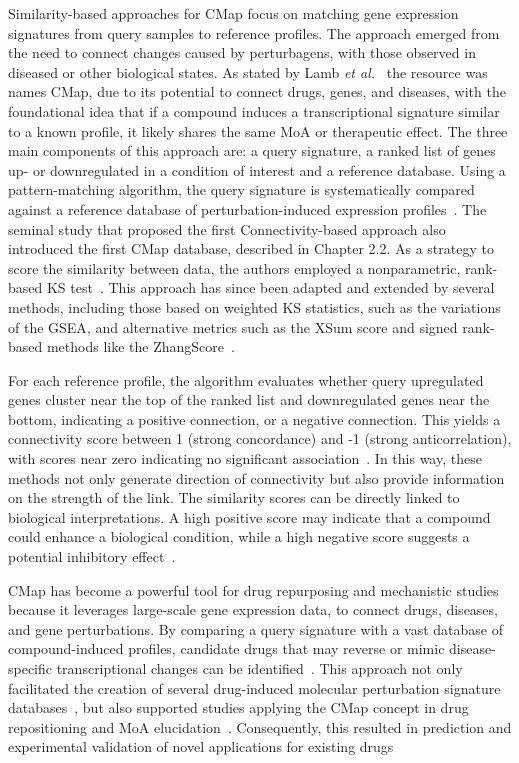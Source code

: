 Similarity-based approaches for \gls{CMap} focus on matching gene expression signatures from query samples to reference profiles. 
The approach emerged from the need to connect changes caused by perturbagens, with those observed in diseased or other biological states.
As stated by Lamb \textit{et al.}~\cite{RN34} the resource was names \gls{CMap}, due to its potential to connect drugs, genes, and diseases, with the foundational idea that if a compound induces a transcriptional signature similar to a known profile, it likely shares the same \gls{MoA} or therapeutic effect. 
The three main components of this approach are: a query signature, a ranked list of genes up- or downregulated in a condition of interest and a reference database.  
Using a pattern-matching algorithm, the query signature is systematically compared against a reference database of perturbation-induced expression profiles~\cite{RN155}. 
The seminal study that proposed the first Connectivity-based approach also introduced the first CMap database, described in Chapter 2.2. 
As a strategy to score the similarity between data, the authors employed a nonparametric, rank-based \gls{KS} test~\cite{RN34, RN79}. 
This approach has since been adapted and extended by several methods, including those based on weighted \gls{KS} statistics, such as the variations of the \gls{GSEA}, and alternative metrics such as the \gls{XSum} score and signed rank-based methods like the ZhangScore~\cite{RN79}. 

For each reference profile, the algorithm evaluates whether query upregulated genes cluster near the top of the ranked list and downregulated genes near the bottom, indicating a positive connection, or a negative connection. 
This yields a connectivity score between 1 (strong concordance) and -1 (strong anticorrelation), with scores near zero indicating no significant association~\cite{RN34}. 
In this way, these methods not only generate direction of connectivity but also provide information on the strength of the link. 
The similarity scores can be directly linked to biological interpretations. 
A high positive score may indicate that a compound could enhance a biological condition, while a high negative score suggests a potential inhibitory effect~\cite{RN102}. 

\gls{CMap} has become a powerful tool for drug repurposing and mechanistic studies because it leverages large-scale gene expression data, to connect drugs, diseases, and gene perturbations. 
By comparing a query signature with a vast database of compound-induced profiles, candidate drugs that may reverse or mimic disease-specific transcriptional changes can be identified~\cite{RN102}. 
This approach not only facilitated the creation of several drug-induced molecular perturbation signature databases~\cite{RN84},  but also supported studies applying the \gls{CMap} concept in drug repositioning and \gls{MoA} elucidation~\cite{RN86}. 
Consequently, this resulted in prediction and experimental validation of novel applications for existing drugs 



